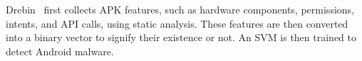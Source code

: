 



Drebin~\cite{arp2014drebin} first collects APK features, such as hardware components, permissions, intents, and API calls, using static analysis.
These features are then converted into a binary vector to signify their existence or not.
An SVM is then trained to detect Android malware.

